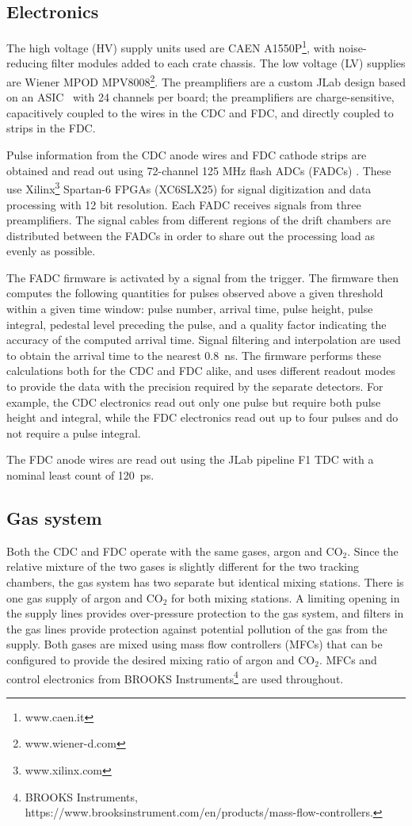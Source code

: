 \subsection{Electronics \label{sec:dcelectronics}}
The high voltage (HV) supply units used are CAEN A1550P\footnote{www.caen.it}, with noise-reducing filter modules added to each crate chassis. 
The low voltage (LV) supplies are Wiener MPOD MPV8008\footnote{www.wiener-d.com}. 
The preamplifiers are a custom JLab design based on an ASIC~\cite{hdnote2515}
with 24 channels per board; the preamplifiers are charge-sensitive, capacitively coupled to the wires in the CDC and FDC, and directly coupled to strips in the FDC. 

Pulse information from the CDC anode wires and FDC cathode strips are obtained and read out using 72-channel 125 MHz flash ADCs (FADCs) \cite{Visser2008,5873864}. These use Xilinx\footnote{www.xilinx.com} Spartan-6 FPGAs (XC6SLX25) for signal digitization and data processing with 12 bit resolution.
Each FADC receives signals from three preamplifiers. 
The signal cables from different regions of the drift chambers are distributed between the FADCs in order to share out the processing load as evenly as possible.  

The FADC firmware is activated by a signal from the \gx{} trigger. The firmware then computes the following quantities for pulses observed above a given threshold within a given time window: pulse number, arrival time, pulse height, pulse integral, pedestal level preceding the pulse, and a quality factor indicating the accuracy of the computed arrival time. 
Signal filtering and interpolation are used to obtain the arrival time to the nearest 0.8~ns. 
The firmware performs these calculations both for the CDC and FDC alike, and uses different readout modes to provide the data with the precision required by the separate detectors. 
For example, the CDC electronics read out only one pulse but require both pulse height and integral, while the FDC electronics read out up to four pulses and do not require a pulse integral.  

The FDC anode wires are read out using the JLab pipeline F1 TDC\cite{hdnote1021} with a nominal least count of 120~ps. 

\subsection[Gas system]{Gas system \label{sec:gas}}
Both the CDC and FDC operate with the same gases, argon and CO$_{2}$. Since the relative mixture of
the two gases is slightly different for the two tracking chambers, the gas system has two separate but identical mixing stations. There is one gas supply of argon and CO$_{2}$ for both mixing stations. A limiting opening in the supply
lines provides over-pressure protection to the gas system, and filters in the gas lines provide protection against potential
pollution of the gas from the supply. Both gases are mixed using mass flow controllers (MFCs) that can be 
configured
to provide the desired mixing ratio of argon and CO$_{2}$.  MFCs and control electronics from
BROOKS Instruments\footnote{BROOKS Instruments, https://www.brooksinstrument.com/en/products/mass-flow-controllers.} are used throughout.

